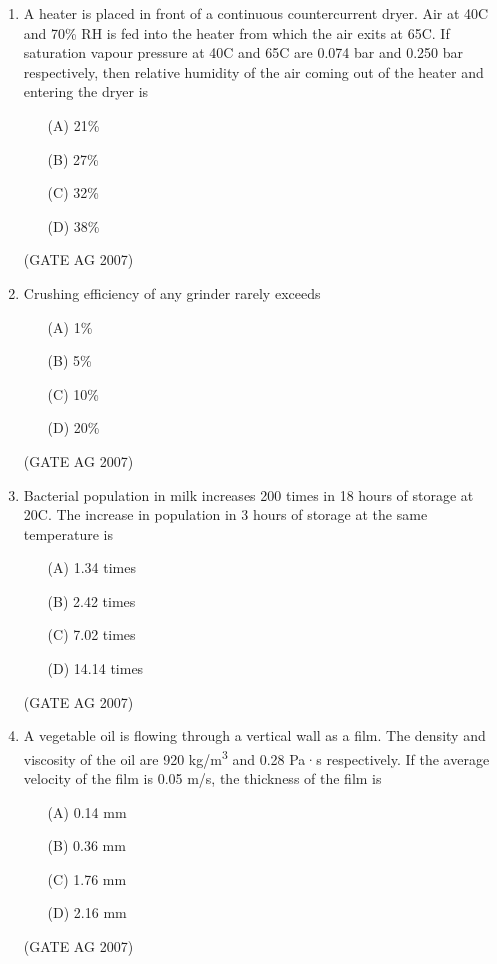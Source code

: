 \documentclass[journal,12pt,onecolumn]{IEEEtran}
\theoremstyle{remark}
\begin{document}
\begin{enumerate}[label=Q\arabic*:]
\item  A heater is placed in front of a continuous countercurrent dryer. Air at 40\degree C and 70\% RH is fed into the heater from which the air exits at 65\degree C. If saturation vapour pressure at 40\degree C and 65\degree C are 0.074 bar and 0.250 bar respectively, then relative humidity of the air coming out of the heater and entering the dryer is
\begin{multicols}{4}
\begin{enumerate}
    \item[(A)] 21\%
    \item[(B)] 27\%
    \item[(C)] 32\%
    \item[(D)] 38\%
\end{enumerate}
\end{multicols}
\hfill(GATE AG 2007)

\item  Crushing efficiency of any grinder rarely exceeds
\begin{multicols}{4}
\begin{enumerate}
    \item[(A)] 1\%
    \item[(B)] 5\%
    \item[(C)] 10\%
    \item[(D)] 20\%
\end{enumerate}
\end{multicols}
\hfill(GATE AG 2007)

\item  Bacterial population in milk increases 200 times in 18 hours of storage at 20\degree C. The increase in population in 3 hours of storage at the same temperature is
\begin{multicols}{4}
\begin{enumerate}
    \item[(A)] 1.34 times
    \item[(B)] 2.42 times
    \item[(C)] 7.02 times
    \item[(D)] 14.14 times
\end{enumerate}
\end{multicols}
\hfill(GATE AG 2007)


\item  A vegetable oil is flowing through a vertical wall as a film. The density and viscosity of the oil are 920 kg/m\textsuperscript{3} and 0.28 Pa·s respectively. If the average velocity of the film is 0.05 m/s, the thickness of the film is
\begin{multicols}{4}
\begin{enumerate}
    \item[(A)] 0.14 mm
    \item[(B)] 0.36 mm
    \item[(C)] 1.76 mm
    \item[(D)] 2.16 mm
\end{enumerate}
\end{multicols}
\hfill(GATE AG 2007)



\end{enumerate}
\end{document}
